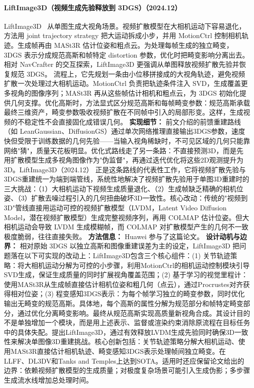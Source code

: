 \paragraph{LiftImage3D（视频生成先验释放到 3DGS）（2024.12）}
LiftImage3D~\cite{2412_09597} 从单图生成大视角场景。视频扩散模型在大相机运动下容易退化，方法用 joint trajectory strategy 把大运动拆成小步，并用 MotionCtrl 控制相机轨迹。生成帧再由 MASt3R 估计位姿和粗点云。为处理每帧生成的独立畸变，3DGS 表示分成规范高斯和帧特定 distortion 参数，优化时把畸变影响分离出去。相对 NavCrafter 的交互探索，LiftImage3D 更强调从单图释放视频扩散先验并恢复规范 3DGS。
流程上，它先规划一条由小位移拼接成的大视角轨迹，避免视频扩散一次处理过大相机运动。MotionCtrl 负责把轨迹条件注入 SVD，生成覆盖更多视角的图像序列；MASt3R 再从这些帧估计相机和粗点云，为 3DGS 初始化提供几何支撑。优化高斯时，方法显式区分规范高斯和每帧畸变参数：规范高斯承载最终三维资产，畸变参数吸收视频扩散在不同帧中引入的局部形变。这样，生成视频的不稳定性不会直接固化成错误几何。
\textbf{实现细节：} 前文介绍的前馈重建路线（如 LeanGaussian、DiffusionGS）通过单次网络推理直接输出3DGS参数，速度快但受限于训练数据的几何先验——当输入视角稀缺时，不可见区域的几何只能靠网络"猜"，质量天花板明显。优化式路线走了另一条路：不直接预测3D，而是先用扩散模型生成多视角图像作为"伪监督"，再通过迭代优化将这些2D观测提升为3D。LiftImage3D（2024.12） 正是这条路线的代表性工作，它将视频扩散先验与3DGS重建统一为端到端管线，系统性地解决了视频扩散先验用于单图3D重建时的三大挑战：（1）大相机运动下视频生成质量退化、（2）生成帧缺乏精确的相机位姿、（3）扩散去噪过程引入的几何扭曲破坏3D一致性。核心改动：传统的"视频到3D"管线直接用运动可控的视频扩散模型（LVDM，Latent Video Diffusion Model，潜在视频扩散模型）生成完整视频序列，再用 COLMAP 估计位姿。但大相机运动会导致 LVDM 生成模糊帧，而 COLMAP 对扩散模型产生的几何不一致极度脆弱，往往直接失败。
\textbf{方法信息：} Huawei 参与了这篇论文。
\textbf{设计动机与边界：} 相对原始 3DGS 以独立高斯和图像重建误差为主的设定，LiftImage3D 把问题落在以下可实现的改动上：LiftImage3D包含三个核心组件：(1) 关节轨迹策略：将大相机运动分解为可控的小步骤，利用MotionCtrl的相机运动控制模块引导SVD生成，保证生成质量的同时扩展视角覆盖范围；(2) 基于学习的视觉里程计：使用MASt3R从生成帧直接估计相机位姿和粗几何（点云），通过Procrustes对齐获得相对位姿；(3) 程变感知3DGS表示：为每个帧学习独立的畸变参数，同时优化输出无畸变的规范高斯。具体地，每个高斯的属性分解为规范部分和帧特定畸变部分，通过优化分离畸变影响。最终从规范高斯实现高质量新视角合成。其设计目的不是单独增加一个模块，而是用上述表示、监督或渲染约束消除原流程在目标任务中的具体失配。提出LiftImage3D，通过有效释放LVDM生成先验同时确保3D一致性来解决单图像3D重建挑战。核心创新包括：关节轨迹策略分解大相机运动、使用MASt3R直接估计相机轨迹、畸变感知3DGS表示处理帧间独立畸变。在LLFF、DL3DV和Tanks and Temples上达到SOTA。适用时还应保留论文给出的边界：依赖视频扩散模型的生成质量；对极度复杂场景可能引入生成伪影；多步骤生成流水线增加总处理时间。
